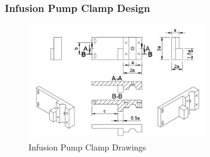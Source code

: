 \subsubsection{Infusion Pump Clamp Design}

\begin{figure}[h]
    \centering
    \includegraphics[width=0.7\textwidth]{Figures/SupportDrawings/inf_pump_clamp_drawing.png}
    \caption{Infusion Pump Clamp Drawings}
    \label{fig:infpumpclampdrawing}
  \end{figure}